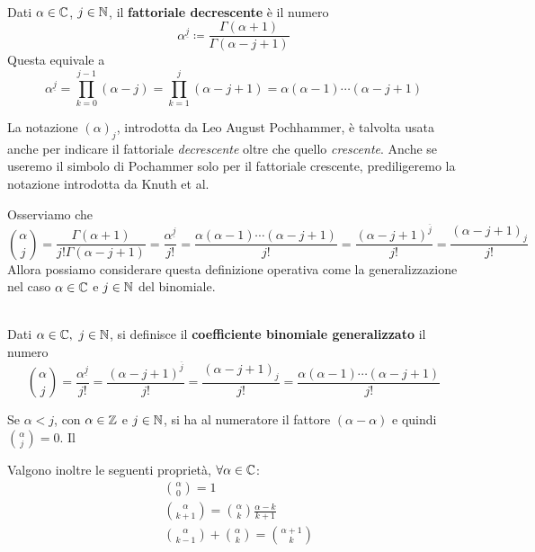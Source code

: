 \begin{define}~{}\\
	Dati $\alpha\in\mathbb{C}$, $j\in\mathbb{N}$, il \textbf{fattoriale decrescente} è il numero
	\begin{equation}
		\alpha^{\underline{j}}\coloneqq\frac{\Gamma\left(\alpha+1\right)}{\Gamma\left(\alpha-j+1\right)}
	\end{equation}
	Questa equivale a
	\begin{equation}
	\alpha^{\underline{j}}=\prod_{k=0}^{j-1}\left(\alpha-j\right)=\prod_{k=1}^{j}\left(\alpha-j+1\right)=\alpha\left(\alpha-1\right)\cdots\left(\alpha-j+1\right)
\end{equation}
\end{define}
\begin{attention}
		La notazione $\left(\alpha\right)_j$, introdotta da Leo August Pochhammer, è talvolta usata anche per indicare il fattoriale \textit{decrescente} oltre che quello \textit{crescente}. Anche se useremo il simbolo di Pochammer solo per il fattoriale crescente, prediligeremo la notazione introdotta da Knuth et al. %
\end{attention}
Osserviamo che
\begin{equation*}
	\binom{\alpha}{j}=\frac{\Gamma\left(\alpha+1\right)}{j!\Gamma\left(\alpha-j+1\right)}=\frac{\alpha^{\underline{j}}}{j!}=\frac{\alpha\left(\alpha-1\right)\cdots\left(\alpha-j+1\right)}{j!}=\frac{\left(\alpha-j+1\right)^{\overline{j}}}{j!}=\frac{\left(\alpha-j+1\right)_j}{j!}
\end{equation*}
Allora possiamo considerare questa definizione operativa come la generalizzazione nel caso $\alpha\in\mathbb{C}$ e $j\in\mathbb{N}$ del binomiale.
\begin{define}~{}\\
	Dati $\alpha\in\complexset,\ j\in\naturalset$, si definisce il \textbf{coefficiente binomiale generalizzato} il numero
	\begin{equation}
		\binom{\alpha}{j}=\frac{\alpha^{\underline{j}}}{j!}=\frac{\left(\alpha-j+1\right)^{\overline{j}}}{j!}=\frac{\left(\alpha-j+1\right)_j}{j!}=\frac{\alpha\left(\alpha-1\right)\cdots\left(\alpha-j+1\right)}{j!}
	\end{equation}
\end{define}
\begin{observe}
	Se $\alpha<j$, con $\alpha\in\mathbb{Z}$ e $j\in\mathbb{N}$, si ha al numeratore il fattore $\left(\alpha-\alpha\right)$ e quindi $\displaystyle\binom{\alpha}{j}=0$. Il 
\end{observe}
Valgono inoltre le seguenti proprietà, $\forall \alpha\in\mathbb{C}$:
\begin{align}
	&\binom{\alpha}{0}=1\\
	&\binom{\alpha}{k+1}=\binom{\alpha}{k}\frac{\alpha-k}{k+1}\\
	&\binom{\alpha}{k-1}+\binom{\alpha}{k}=\binom{\alpha+1}{k}
\end{align}
